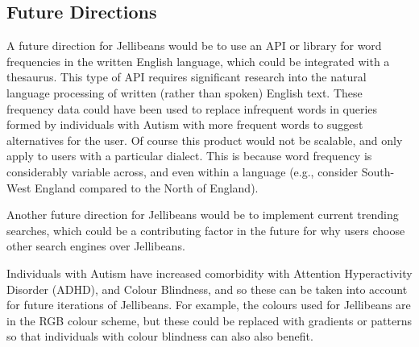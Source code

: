 \documentclass[a4paper, 11pt]{article}
\begin{document}
\subsection{Future Directions}
A future direction for Jellibeans would be to use an API or library for word frequencies in the written English language, which could be integrated with a thesaurus. This type of API requires significant research into the natural language processing of written (rather than spoken) English text. These frequency data could have been used to replace infrequent words in queries formed by individuals with Autism with more frequent words to suggest alternatives for the user. Of course this product would not be scalable, and only apply to users with a particular dialect. This is because word frequency is considerably variable across, and even within a language (e.g., consider South-West England compared to the North of England).

\vspace{5mm}
Another future direction for Jellibeans would be to implement current trending searches, which could be a contributing factor in the future for why users choose other search engines over Jellibeans. 

\vspace{5mm}
Individuals with Autism have increased comorbidity with Attention Hyperactivity Disorder (ADHD), and Colour Blindness, and so these can be taken into account for future iterations of Jellibeans. For example, the colours used for Jellibeans are in the RGB colour scheme, but these could be replaced with gradients or patterns so that individuals with colour blindness can also also benefit.
\end{document}
